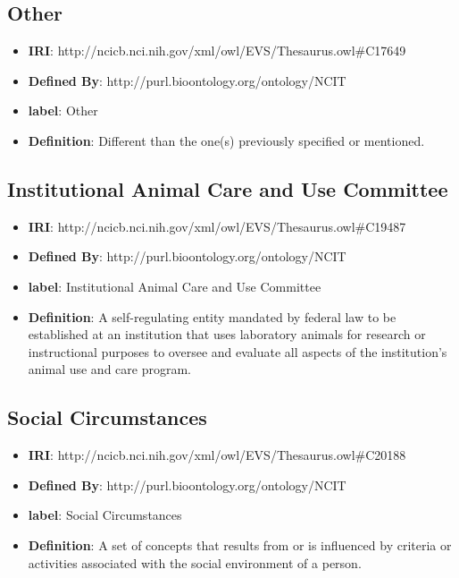 \documentclass[a4paper,12pt,oneside]{article}
\begin{document}
  \subsection{Other}

  \begin{itemize}
     \item \textbf{IRI}: http://ncicb.nci.nih.gov/xml/owl/EVS/Thesaurus.owl\#C17649
     \item \textbf{Defined By}: http://purl.bioontology.org/ontology/NCIT
     \item \textbf{label}: Other
     \item \textbf{Definition}: Different than the one(s) previously specified or mentioned.
  \end{itemize}  

  
  \subsection{Institutional Animal Care and Use Committee}

  \begin{itemize}
     \item \textbf{IRI}: http://ncicb.nci.nih.gov/xml/owl/EVS/Thesaurus.owl\#C19487
     \item \textbf{Defined By}: http://purl.bioontology.org/ontology/NCIT
     \item \textbf{label}: Institutional Animal Care and Use Committee
     \item \textbf{Definition}: A self-regulating entity mandated by federal law to be established at an institution that uses laboratory animals for research or instructional purposes to oversee and evaluate all aspects of the institution's animal use and care program.
  \end{itemize}


  \subsection{Social Circumstances}

  \begin{itemize}
     \item \textbf{IRI}: http://ncicb.nci.nih.gov/xml/owl/EVS/Thesaurus.owl\#C20188
     \item \textbf{Defined By}: http://purl.bioontology.org/ontology/NCIT
     \item \textbf{label}: Social Circumstances
     \item \textbf{Definition}: A set of concepts that results from or is influenced by criteria or activities associated with the social environment of a person.
  \end{itemize}
\end{document}
